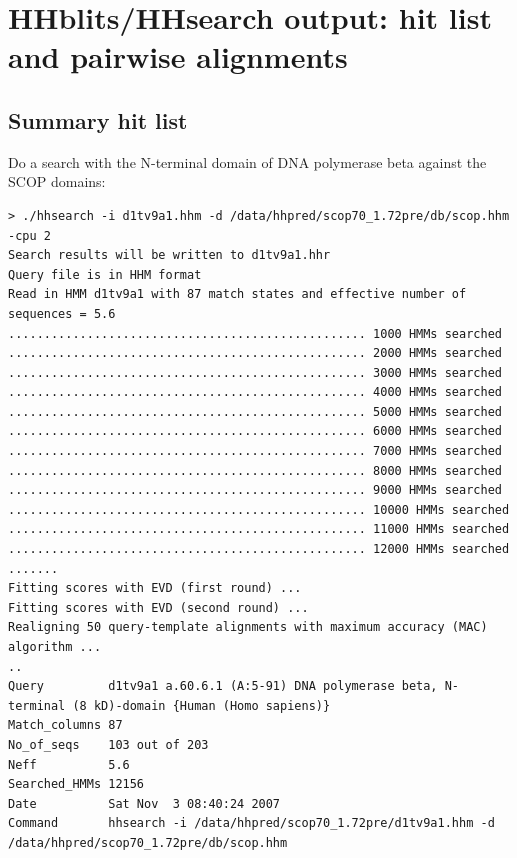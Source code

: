 \documentclass[11pt,a4paper]{article}
\begin{document}
\section{HHblits/HHsearch output: hit list and pairwise alignments}

\subsection{Summary hit list}

Do a search with the N-terminal domain of DNA polymerase beta against the SCOP domains:


\scriptsize\begin{verbatim}
> ./hhsearch -i d1tv9a1.hhm -d /data/hhpred/scop70_1.72pre/db/scop.hhm -cpu 2
Search results will be written to d1tv9a1.hhr
Query file is in HHM format
Read in HMM d1tv9a1 with 87 match states and effective number of sequences = 5.6
.................................................. 1000 HMMs searched
.................................................. 2000 HMMs searched
.................................................. 3000 HMMs searched
.................................................. 4000 HMMs searched
.................................................. 5000 HMMs searched
.................................................. 6000 HMMs searched
.................................................. 7000 HMMs searched
.................................................. 8000 HMMs searched
.................................................. 9000 HMMs searched
.................................................. 10000 HMMs searched
.................................................. 11000 HMMs searched
.................................................. 12000 HMMs searched
.......
Fitting scores with EVD (first round) ...
Fitting scores with EVD (second round) ...
Realigning 50 query-template alignments with maximum accuracy (MAC) algorithm ...
..
Query         d1tv9a1 a.60.6.1 (A:5-91) DNA polymerase beta, N-terminal (8 kD)-domain {Human (Homo sapiens)} 
Match_columns 87
No_of_seqs    103 out of 203
Neff          5.6 
Searched_HMMs 12156
Date          Sat Nov  3 08:40:24 2007
Command       hhsearch -i /data/hhpred/scop70_1.72pre/d1tv9a1.hhm -d /data/hhpred/scop70_1.72pre/db/scop.hhm 


\end{verbatim}
\end{document}

